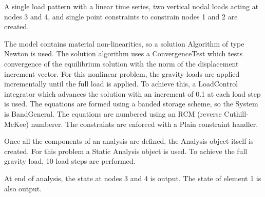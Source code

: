 \documentclass[12pt]{article}
\begin{document}
A single load pattern with a linear time series, two
vertical nodal loads acting at nodes 3 and 4, and single
point constraints to constrain nodes 1 and 2 are created.

\vspace{0.2in}

The model contains material non-linearities, so a solution Algorithm of type
Newton is used. The solution algorithm uses a ConvergenceTest which tests
convergence of the equilibrium solution with the norm of the
displacement increment vector.  
For this nonlinear problem, the gravity loads are applied
incrementally until the full load is applied. To achieve this, a
LoadControl integrator which advances the solution with an
increment of 0.1 at each load step is used. 
The equations are formed using a banded storage scheme, so the System
is BandGeneral. The equations are numbered using an RCM (reverse
Cuthill-McKee) numberer. The constraints are enforced with a
Plain constraint handler.  

Once all the components of an analysis are defined, the Analysis
object itself is created.  For this problem a Static Analysis object
is used. To achieve the full gravity load, 10 load steps are
performed.

\vspace{0.2in} 

At end of analysis, the state at nodes 3 and 4 is output. The state of
element 1 is also output. 
\end{document}
